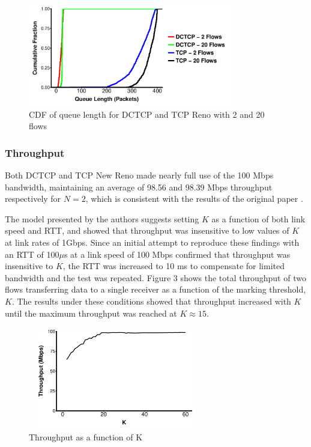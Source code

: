 \begin{figure}
\includegraphics[height=1.75in,width=3.5in]{queue_cdf}
\caption{CDF of queue length for DCTCP and TCP Reno with 2 and 20 flows}
\end{figure}

\subsubsection{Throughput}

 Both DCTCP and TCP New Reno made nearly full use of the 100 Mbps bandwidth, maintaining an average of 98.56 and 98.39 Mbps throughput respectively for $N = 2$, which is consistent with the results of the original paper \cite{alizadeh_data_2010}.

The model presented by the authors suggests setting $K$ as a function of both link speed and RTT, and showed that throughput was insensitive to low values of $K$ at link rates of 1Gbps. Since an initial attempt to reproduce these findings with an RTT of 100$\mu$s at a link speed of 100 Mbps confirmed that throughput was insensitive to $K$, the RTT was increased to 10 ms to compensate for limited bandwidth and the test was repeated. Figure 3 shows the total throughput of two flows transferring data to a single receiver as a function of the marking threshold, $K$. The results under these conditions showed that throughput increased with $K$ until the maximum throughput was reached at $K \approx 15$. 

\begin{figure}
\includegraphics[height=1.75in,width=3in]{k_throughput}
\caption{Throughput as a function of K}
\end{figure}

